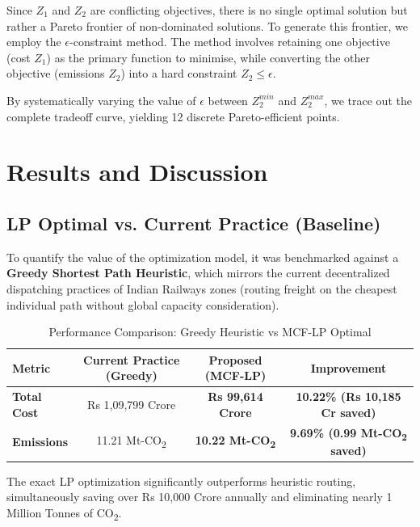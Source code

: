 \documentclass[11pt, a4paper]{article}
\numberwithin{equation}{section}
\numberwithin{figure}{section}
\numberwithin{table}{section}
\begin{document}
Since $Z_1$ and $Z_2$ are conflicting objectives, there is no single optimal solution
but rather a Pareto frontier of non-dominated solutions. To generate this frontier, we
employ the $\epsilon$-constraint method. The method involves retaining one objective
(cost $Z_1$) as the primary function to minimise, while converting the other objective
(emissions $Z_2$) into a hard constraint $Z_2 \leq \epsilon$.

By systematically varying the value of $\epsilon$ between $Z_2^{min}$ and $Z_2^{max}$,
we trace out the complete tradeoff curve, yielding 12 discrete Pareto-efficient points.

\section{Results and Discussion}
\label{sec:results}

\subsection{LP Optimal vs. Current Practice (Baseline)}
To quantify the value of the optimization model, it was benchmarked against a \textbf{Greedy Shortest Path Heuristic}, which mirrors the current decentralized dispatching practices of Indian Railways zones (routing freight on the cheapest individual path without global capacity consideration).

\begin{table}[H]
    \centering
    \caption{Performance Comparison: Greedy Heuristic vs MCF-LP Optimal}
    \label{tab:heuristic_gap}
    \begin{tabular}{lccc}
        \toprule
        \textbf{Metric} & \textbf{Current Practice (Greedy)} & \textbf{Proposed (MCF-LP)} & \textbf{Improvement} \\
        \midrule
        \textbf{Total Cost} & Rs 1,09,799 Crore & \textbf{Rs 99,614 Crore} & \textbf{10.22\% (Rs 10,185 Cr saved)} \\
        \textbf{Emissions} & 11.21 Mt-CO\textsubscript{2} & \textbf{10.22 Mt-CO\textsubscript{2}} & \textbf{9.69\% (0.99 Mt-CO\textsubscript{2} saved)} \\
        \bottomrule
    \end{tabular}
\end{table}

The exact LP optimization significantly outperforms heuristic routing, simultaneously saving over Rs 10,000 Crore annually and eliminating nearly 1 Million Tonnes of CO\textsubscript{2}.
\end{document}
